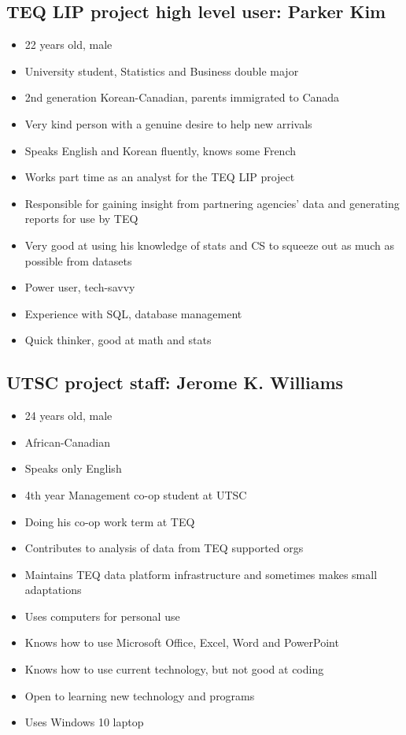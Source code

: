 \documentclass[]{scrartcl}
\begin{document}
\subsection{TEQ LIP project high level user: Parker Kim}
\begin{itemize}
	\item 22 years old, male
	\item University student, Statistics and Business double major
	\item 2nd generation Korean-Canadian, parents immigrated to Canada
	\item Very kind person with a genuine desire to help new arrivals
	\item Speaks English and Korean fluently, knows some French
	\item Works part time as an analyst for the TEQ LIP project
	\item Responsible for gaining insight from partnering agencies' data and generating reports for use by TEQ
	\item Very good at using his knowledge of stats and CS to squeeze out as much as possible from datasets
	\item Power user, tech-savvy 
	\item Experience with SQL, database management
	\item Quick thinker, good at math and stats
\end{itemize}

\subsection{UTSC project staff: Jerome K. Williams}
\begin{itemize}
	\item 24 years old, male
	\item African-Canadian
	\item Speaks only English
	\item 4th year Management co-op student at UTSC
	\item Doing his co-op work term at TEQ
	\item Contributes to analysis of data from TEQ supported orgs
	\item Maintains TEQ data platform infrastructure and sometimes makes small adaptations
	\item Uses computers for personal use
	\item Knows how to use Microsoft Office, Excel, Word and PowerPoint
	\item Knows how to use current technology, but not good at coding
	\item Open to learning new technology and programs
	\item Uses Windows 10 laptop
\end{itemize}
\end{document}

